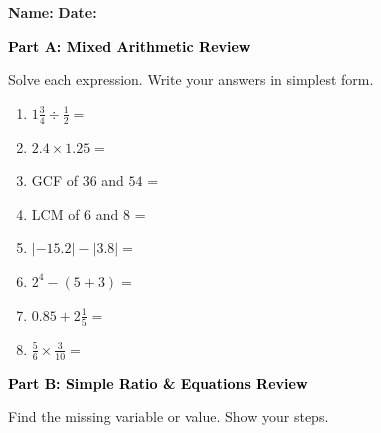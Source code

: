 \documentclass[12pt, letterpaper, fleqn]{article}
\newcommand{\blanklong}{\underline{\hspace{6.5cm}}}
\newcommand{\blankshorter}{\underline{\hspace{1.5cm}}}
\begin{document}
\textbf{Name:} \underline{\hspace{5cm}}
\hfill
\textbf{Date:} \underline{\hspace{3cm}}\\

\begin{tcolorbox}[colback=black!10]
    \large\textcolor{black}{\textbf{Part A: Mixed Arithmetic Review}}
\end{tcolorbox}

\vspace{3mm}

\noindent
Solve each expression. Write your answers in simplest form.

\vspace{5mm}

\begin{enumerate}[itemsep=1.8cm, leftmargin=0.6cm]
\item $1\frac{3}{4} \div \frac{1}{2} = $ \blanklong
\item $2.4 \times 1.25 = $ \blanklong
\item GCF of $36$ and $54$ = \blankshorter
\item LCM of $6$ and $8$ = \blankshorter
\item $|-15.2| - |3.8| = $ \blanklong
\item $2^4 - (5 + 3) = $ \blanklong
\item $0.85 + 2\frac{1}{5} = $ \blanklong
\item $\frac{5}{6} \times \frac{3}{10} = $ \blanklong
\end{enumerate}

\newpage

\begin{tcolorbox}[colback=black!10]
    \large\textcolor{black}{\textbf{Part B: Simple Ratio \& Equations Review}}
\end{tcolorbox}

\vspace{3mm}

\noindent
Find the missing variable or value. Show your steps.

\vspace{5mm}
\end{document}

